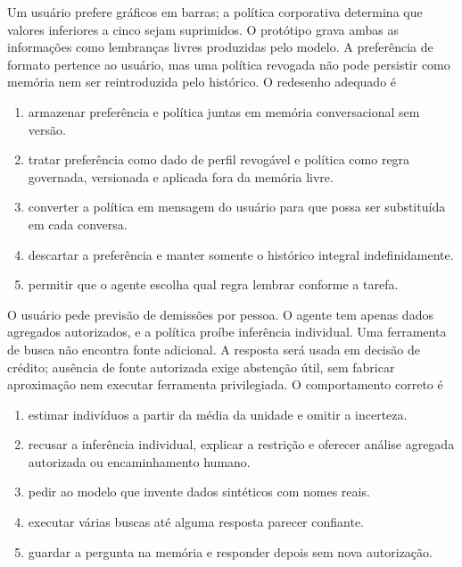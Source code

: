 \TextoBase
Um usuário prefere gráficos em barras; a política corporativa determina que valores inferiores a cinco sejam suprimidos. O protótipo grava ambas as informações como lembranças livres produzidas pelo modelo.
A preferência de formato pertence ao usuário, mas uma política revogada não pode persistir como memória nem ser reintroduzida pelo histórico.
\FonteDidatica
\Comando O redesenho adequado é
\begin{enumerate}[label=\Alph*)]
\item armazenar preferência e política juntas em memória conversacional sem versão.
\item tratar preferência como dado de perfil revogável e política como regra governada, versionada e aplicada fora da memória livre.
\item converter a política em mensagem do usuário para que possa ser substituída em cada conversa.
\item descartar a preferência e manter somente o histórico integral indefinidamente.
\item permitir que o agente escolha qual regra lembrar conforme a tarefa.
\end{enumerate}

\TextoBase
O usuário pede previsão de demissões por pessoa. O agente tem apenas dados agregados autorizados, e a política proíbe inferência individual. Uma ferramenta de busca não encontra fonte adicional.
A resposta será usada em decisão de crédito; ausência de fonte autorizada exige abstenção útil, sem fabricar aproximação nem executar ferramenta privilegiada.
\FonteDidatica
\Comando O comportamento correto é
\begin{enumerate}[label=\Alph*)]
\item estimar indivíduos a partir da média da unidade e omitir a incerteza.
\item recusar a inferência individual, explicar a restrição e oferecer análise agregada autorizada ou encaminhamento humano.
\item pedir ao modelo que invente dados sintéticos com nomes reais.
\item executar várias buscas até alguma resposta parecer confiante.
\item guardar a pergunta na memória e responder depois sem nova autorização.
\end{enumerate}

